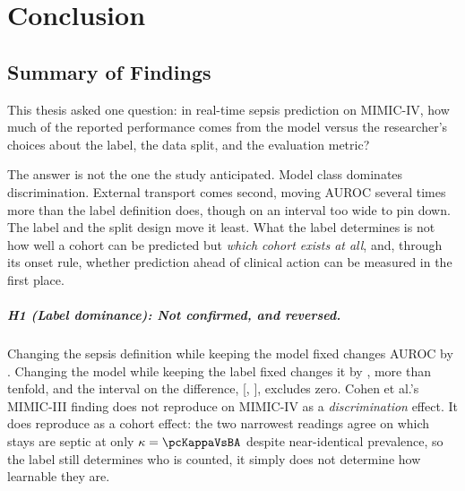 \chapter{Conclusion}
\label{ch:conclusion}


\section{Summary of Findings}

This thesis asked one question: in real-time sepsis prediction on MIMIC-IV, how
much of the reported performance comes from the model versus the researcher's
choices about the label, the data split, and the evaluation metric?

The answer is not the one the study anticipated. Model class dominates
discrimination. External transport comes second, moving AUROC several times
more than the label definition does, though on an interval too wide to pin
down. The label and the split design move it least. What the label determines is
not how well a cohort can be predicted but \emph{which cohort exists at all},
and, through its onset rule, whether prediction ahead of clinical action can be
measured in the first place.

\paragraph{H1 (Label dominance): Not confirmed, and reversed.}
Changing the sepsis definition while keeping the model fixed changes AUROC by
\pcSpreadLabel. Changing the model while keeping the label fixed changes it by
\pcSpreadModelClass{}, more than tenfold, and the interval on the
difference, [\pcHOneCiLo, \pcHOneCiHi], excludes zero. Cohen et al.'s
\cite{cohen2024subtle} MIMIC-III finding does not reproduce on MIMIC-IV as a
\emph{discrimination} effect. It does reproduce as a cohort effect: the two
narrowest readings agree on which stays are septic at only
$\kappa = \pcKappaVsBA$ despite near-identical prevalence, so the label still
determines who is counted, it simply does not determine how learnable they
are.

